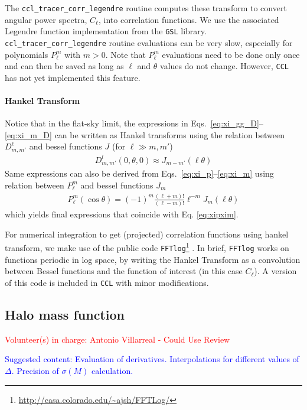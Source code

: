 \documentclass[\docopts]{\docclass}
\newcommand{\vol}[1]{\textcolor{red}{Volunteer(s) in charge: #1}}
\newcommand{\cont}[1]{\textcolor{blue}{Suggested content: #1}}
\newcommand{\ccl}{{\tt CCL}\xspace}
\begin{document}
The {\tt ccl\_tracer\_corr\_legendre} routine computes these transform to convert angular power
spectra, $C_\ell$, into correlation functions. We use the associated Legendre function
implementation from the {\tt GSL} library. {\tt ccl\_tracer\_corr\_legendre} routine evaluations
can be very slow, especially for polynomials $P_\ell^m$ with $m>0$. Note that $P_\ell^m$
evaluations need to be done only once and can then be saved as long as $\ell$ and $\theta$ values
do not change. However, \ccl has not yet implemented this feature.

\paragraph{Hankel Transform}
Notice that in the flat-sky limit, the expressions in Eqs.~\ref{eq:xi_gg_D}--\ref{eq:xi_m_D} can be
written as Hankel transforms using the relation between $D_{m,m'}^\ell$ and bessel functions $J$
(for $\ell\gg m,m'$)
\begin{align}
  D^{l}_{m,m'}(0,\theta,0)\approx J_{m-m'}(\ell\theta)
\end{align}
Same expressions can also be derived from Eqs.~\ref{eq:xi_p}--\ref{eq:xi_m} using relation between $P_{\ell}^m$ and bessel functions $J_m$
\citep{Putter2010}
\begin{align}
  P_{\ell}^m(\cos\theta)=(-1)^m\frac{(\ell+m)!}{(\ell-m)!}\ell^{-m}J_m(\ell\theta)
\end{align}
which yields final expressions that coincide with Eq. \ref{eq:xipxim}.

For numerical integration to get (projected) correlation functions using hankel transform,
we make use of the
public code {\tt FFTlog}\footnote{\url{http://casa.colorado.edu/~ajsh/FFTLog/}}
\citep{Hamilton2000,Talman2009}. In brief, {\tt FFTlog} works on functions periodic in log space,
by writing the Hankel Transform as a convolution between Bessel functions and the function of
interest (in this case $C_\ell$). A version of this code is included in \ccl with minor
modifications.

\subsection{Halo mass function}
\vol{Antonio Villarreal - Could Use Review}

\cont{Evaluation of derivatives. Interpolations for different values of $\Delta$. Precision of $\sigma(M)$ calculation.}
\end{document}
